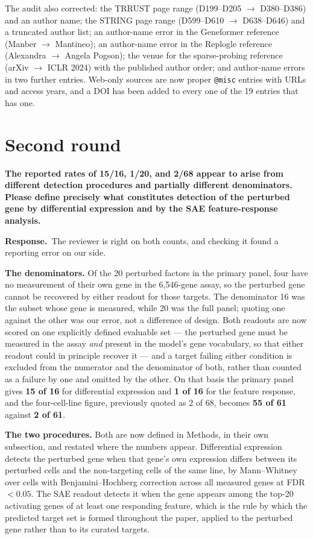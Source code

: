 \documentclass[11pt]{article}
\newcommand{\point}[1]{\vspace{0.7em}\noindent\textbf{#1}\par\vspace{0.15em}}
\newcommand{\reply}{\par\vspace{0.3em}\noindent\textbf{Response.}\ }
\begin{document}
The audit also corrected: the TRRUST page range (D199--D205 $\rightarrow$ D380--D386) and an author
name; the STRING page range (D599--D610 $\rightarrow$ D638--D646) and a truncated author list; an
author-name error in the Geneformer reference (Manber $\rightarrow$ Mantineo); an author-name error
in the Replogle reference (Alexandra $\rightarrow$ Angela Pogson); the venue for the sparse-probing
reference (arXiv $\rightarrow$ ICLR 2024) with the published author order; and author-name errors in
two further entries. Web-only sources are now proper \texttt{@misc} entries with URLs and access
years, and a DOI has been added to every one of the 19 entries that has one.

\section*{Second round}

\point{The reported rates of 15/16, 1/20, and 2/68 appear to arise from different detection
procedures and partially different denominators. Please define precisely what constitutes detection
of the perturbed gene by differential expression and by the SAE feature-response analysis.}
\reply The reviewer is right on both counts, and checking it found a reporting error on our side.

\textbf{The denominators.} Of the 20 perturbed factors in the primary panel, four have no
measurement of their own gene in the 6,546-gene assay, so the perturbed gene cannot be recovered by
either readout for those targets. The denominator 16 was the subset whose gene is measured, while
20 was the full panel; quoting one against the other was our error, not a difference of design.
Both readouts are now scored on one explicitly defined evaluable set --- the perturbed gene must be
measured in the assay \emph{and} present in the model's gene vocabulary, so that either readout
could in principle recover it --- and a target failing either condition is excluded from the
numerator and the denominator of both, rather than counted as a failure by one and omitted by the
other. On that basis the primary panel gives \textbf{15 of 16} for differential expression and
\textbf{1 of 16} for the feature response, and the four-cell-line figure, previously quoted as
2 of 68, becomes \textbf{55 of 61} against \textbf{2 of 61}.

\textbf{The two procedures.} Both are now defined in Methods, in their own subsection, and restated
where the numbers appear. Differential expression detects the perturbed gene when that gene's own
expression differs between its perturbed cells and the non-targeting cells of the same line, by
Mann--Whitney over cells with Benjamini--Hochberg correction across all measured genes at
FDR $< 0.05$. The SAE readout detects it when the gene appears among the top-20 activating genes of
at least one responding feature, which is the rule by which the predicted target set is formed
throughout the paper, applied to the perturbed gene rather than to its curated targets.
\end{document}

